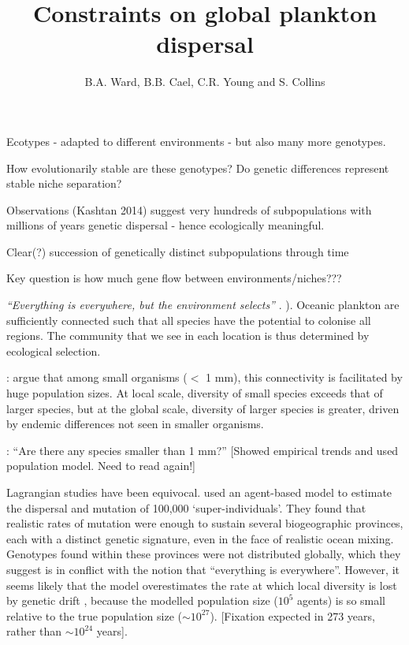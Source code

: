 \documentclass[12pt]{article}
\title{Constraints on global plankton dispersal}
\author{B.A. Ward, B.B. Cael, C.R. Young and S. Collins}
\date{} %
\begin{document}
 

\maketitle


Ecotypes - adapted to different environments - but also many more genotypes.

How evolutionarily stable are these genotypes? Do genetic differences represent stable niche separation?

Observations (Kashtan 2014) suggest very hundreds of subpopulations with millions of years genetic dispersal - hence ecologically meaningful.

Clear(?) succession of genetically distinct subpopulations through time

Key question is how much gene flow between environments/niches???




\textit{``Everything is everywhere, but the environment selects''} \citep{BaasBecking:1934}. \citep[Also Beijerinck: one particular species of bacteria found anywhere on Earth, provided environmental requirements are met...][]{Fenchel:2004} ). Oceanic plankton are sufficiently connected such that all species have the potential to colonise all regions. The community that we see in each location is thus determined by ecological selection. 

\citet{Fenchel:2004}: argue that among small organisms ($<$ 1 mm), this connectivity is facilitated by huge population sizes. At local scale, diversity of small species exceeds that of larger species, but at the global scale, diversity of larger species is greater, driven by endemic differences not seen in smaller organisms. 



\citet{Rossberg:2013}: ``Are there any species smaller than 1 mm?'' [Showed empirical trends and used population model. Need to read again!]


Lagrangian studies have been equivocal. \citet{Hellweger:2014} used an agent-based model to estimate the dispersal and mutation of 100,000 `super-individuals'. They found that realistic rates of mutation were enough to sustain several biogeographic provinces, each with a distinct genetic signature, even in the face of realistic ocean mixing. Genotypes found within these provinces were not distributed globally, which they suggest is in conflict with the notion that “everything is everywhere”. However, it seems likely that the model overestimates the rate at which local diversity is lost by genetic drift \citep[i.e. coalescence??][]{Kingman:1982}, because the modelled population size ($10^{5}$ agents) is so small relative to the true population size ($\sim10^{27}$). [Fixation expected in 273 years, rather than $\sim10^{24}$ years].
\end{document}
